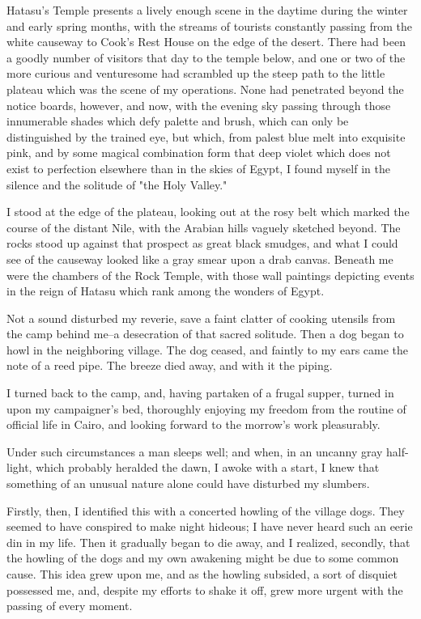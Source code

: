 Hatasu's Temple presents a lively enough scene in the daytime during
the winter and early spring months, with the streams of tourists
constantly passing from the white causeway to Cook's Rest House on the
edge of the desert. There had been a goodly number of visitors that day
to the temple below, and one or two of the more curious and
venturesome had scrambled up the steep path to the little plateau
which was the scene of my operations. None had penetrated beyond the
notice boards, however, and now, with the evening sky passing through
those innumerable shades which defy palette and brush, which can only
be distinguished by the trained eye, but which, from palest blue melt
into exquisite pink, and by some magical combination form that deep
violet which does not exist to perfection elsewhere than in the skies
of Egypt, I found myself in the silence and the solitude of "the Holy
Valley."

I stood at the edge of the plateau, looking out at the rosy belt which
marked the course of the distant Nile, with the Arabian hills vaguely
sketched beyond. The rocks stood up against that prospect as great
black smudges, and what I could see of the causeway looked like a gray
smear upon a drab canvas. Beneath me were the chambers of the Rock
Temple, with those wall paintings depicting events in the reign of
Hatasu which rank among the wonders of Egypt.

Not a sound disturbed my reverie, save a faint clatter of cooking
utensils from the camp behind me--a desecration of that sacred
solitude. Then a dog began to howl in the neighboring village.
The dog ceased, and faintly to my ears came the note of a reed
pipe. The breeze died away, and with it the piping.

I turned back to the camp, and, having partaken of a frugal supper,
turned in upon my campaigner's bed, thoroughly enjoying my freedom
from the routine of official life in Cairo, and looking forward to
the morrow's work pleasurably.

Under such circumstances a man sleeps well; and when, in an uncanny
gray half-light, which probably heralded the dawn, I awoke with a
start, I knew that something of an unusual nature alone could have
disturbed my slumbers.

Firstly, then, I identified this with a concerted howling of the
village dogs. They seemed to have conspired to make night hideous;
I have never heard such an eerie din in my life. Then it gradually
began to die away, and I realized, secondly, that the howling of the
dogs and my own awakening might be due to some common cause. This
idea grew upon me, and as the howling subsided, a sort of disquiet
possessed me, and, despite my efforts to shake it off, grew more
urgent with the passing of every moment.

